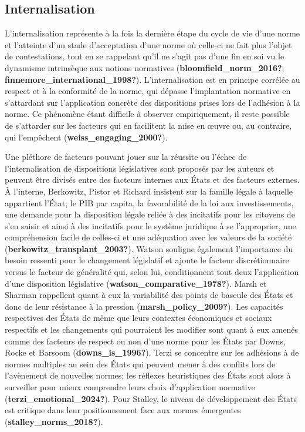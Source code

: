 \documentclass[12pt]{ulaval}
\begin{document}
\subsection{Internalisation}\label{internalisation}

L'internalisation représente à la fois la dernière étape du cycle de vie d'une norme et l'atteinte d'un stade d'acceptation d'une norme où celle-ci ne fait plus l'objet de contestations, tout en se rappelant qu'il ne s'agit pas d'une fin en soi vu le dynamisme intrinsèque aux notions normatives (\textbf{bloomfield\_norm\_2016?}; \textbf{finnemore\_international\_1998?}). L'internalisation est en principe corrélée au respect et à la conformité de la norme, qui dépasse l'implantation normative en s'attardant sur l'application concrète des dispositions prises lors de l'adhésion à la norme. Ce phénomène étant difficile à observer empiriquement, il reste possible de s'attarder sur les facteurs qui en facilitent la mise en œuvre ou, au contraire, qui l'empêchent (\textbf{weiss\_engaging\_2000?}).

Une pléthore de facteurs pouvant jouer sur la réussite ou l'échec de l'internalisation de dispositions législatives sont proposés par les auteurs et peuvent être divisés entre des facteurs internes aux États et des facteurs externes. À l'interne, Berkowitz, Pistor et Richard insistent sur la famille légale à laquelle appartient l'État, le PIB par capita, la favorabilité de la loi aux investissements, une demande pour la disposition légale reliée à des incitatifs pour les citoyens de s'en saisir et ainsi à des incitatifs pour le système juridique à se l'approprier, une compréhension facile de celles-ci et une adéquation avec les valeurs de la société (\textbf{berkowitz\_transplant\_2003?}). Watson souligne également l'importance du besoin ressenti pour le changement législatif et ajoute le facteur discrétionnaire versus le facteur de généralité qui, selon lui, conditionnent tout deux l'application d'une disposition législative (\textbf{watson\_comparative\_1978?}). Marsh et Sharman rappellent quant à eux la variabilité des points de bascule des États et donc de leur résistance à la pression (\textbf{marsh\_policy\_2009?}). Les capacités respectives des États de même que leurs contextes économiques et sociaux respectifs et les changements qui pourraient les modifier sont quant à eux amenés comme des facteurs de respect ou non d'une norme pour les États par Downs, Rocke et Barsoom (\textbf{downs\_is\_1996?}). Terzi se concentre sur les adhésions à de normes multiples au sein des États qui peuvent mener à des conflits lors de l'avènement de nouvelles normes; les réflexes heuristiques des États sont alors à surveiller pour mieux comprendre leurs choix d'application normative (\textbf{terzi\_emotional\_2024?}). Pour Stalley, le niveau de développement des États est critique dans leur positionnement face aux normes émergentes (\textbf{stalley\_norms\_2018?}).
\end{document}
